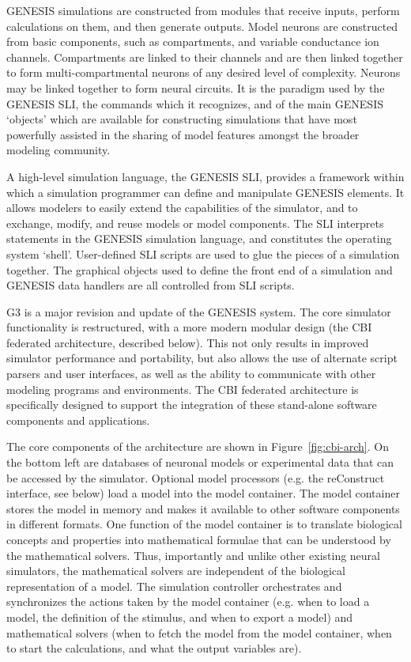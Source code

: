\documentclass[12pt]{article}
\begin{document}
GENESIS simulations are constructed from modules that receive inputs,
perform calculations on them, and then generate outputs. Model neurons
are constructed from basic components, such as compartments, and
variable conductance ion channels. Compartments are linked to their
channels and are then linked together to form multi-compartmental
neurons of any desired level of complexity. Neurons may be linked
together to form neural circuits.  It is the paradigm used by the
GENESIS SLI, the commands which it recognizes, and of the main GENESIS
`objects' which are available for constructing simulations that have
most powerfully assisted in the sharing of model features amongst the
broader modeling community.

A high-level simulation language, the GENESIS SLI, provides a
framework within which a simulation programmer can define and
manipulate GENESIS elements. It allows modelers to easily extend the
capabilities of the simulator, and to exchange, modify, and reuse
models or model components. The SLI interprets statements in the
GENESIS simulation language, and constitutes the operating system
`shell'. User-defined SLI scripts are used to glue the pieces of a
simulation together. The graphical objects used to define the front
end of a simulation and GENESIS data handlers are all controlled from
SLI scripts.

G3 is a major revision and update of the GENESIS system.  The core
simulator functionality is restructured, with a more modern modular
design (the CBI federated architecture, described below). This not
only results in improved simulator performance and portability, but
also allows the use of alternate script parsers and user interfaces,
as well as the ability to communicate with other modeling programs and
environments. The CBI federated architecture is specifically designed
to support the integration of these stand-alone software components
and applications.

The core components of the architecture are shown in
Figure~\ref{fig:cbi-arch}. On the bottom left are databases of
neuronal models or experimental data that can be accessed by the
simulator. Optional model processors (e.g. the reConstruct interface,
see below) load a model into the model container.  The model container
stores the model in memory and makes it available to other software
components in different formats.  One function of the model container
is to translate biological concepts and properties into mathematical
formulae that can be understood by the mathematical solvers. Thus,
importantly and unlike other existing neural simulators, the
mathematical solvers are independent of the biological representation
of a model. The simulation controller orchestrates and synchronizes
the actions taken by the model container (e.g. when to load a model,
the definition of the stimulus, and when to export a model) and
mathematical solvers (when to fetch the model from the model
container, when to start the calculations, and what the output
variables are).
\end{document}

